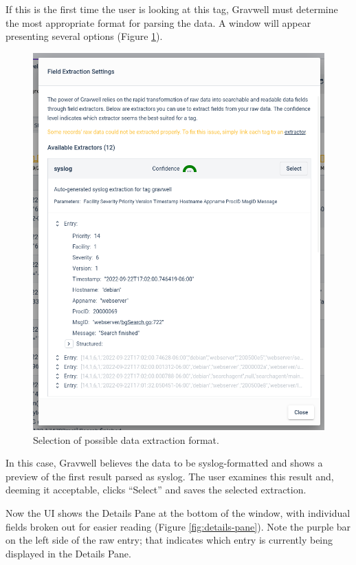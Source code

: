 If this is the first time the user is looking at this tag, Gravwell must determine the most appropriate format for parsing the data. A window will appear presenting several options (Figure \ref{fig:field-extraction}).

\begin{figure}
	\includegraphics[width=0.8\linewidth]{images/field-extraction.png}
	\caption{Selection of possible data extraction format.}
	\label{fig:field-extraction}
\end{figure}

In this case, Gravwell believes the data to be syslog-formatted and shows a preview of the first result parsed as syslog. The user examines this result and, deeming it acceptable, clicks ``Select'' and saves the selected extraction.

Now the UI shows the Details Pane at the bottom of the window, with individual fields broken out for easier reading (Figure \ref{fig:details-pane}). Note the purple bar on the left side of the raw entry; that indicates which entry is currently being displayed in the Details Pane.

